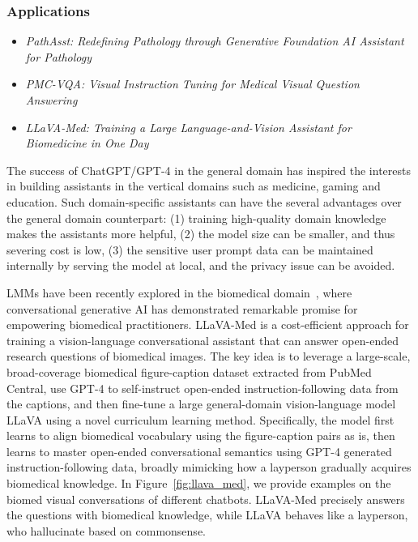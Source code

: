 \documentclass{article}
\begin{document}
\subsubsection{Applications}

\begin{itemize}[leftmargin=7.5mm]
\setlength{\itemsep}{2pt}
\footnotesize
\item 
{\it PathAsst: Redefining Pathology through Generative Foundation AI Assistant for Pathology~\citep{sun2023pathasst}}

\item
{\it PMC-VQA: Visual Instruction Tuning for Medical Visual Question Answering~\citep{zhang2023pmc}}

\item
{\it LLaVA-Med: Training a Large Language-and-Vision Assistant for Biomedicine in One Day~\citep{li2023llava}}
\end{itemize}

The success of ChatGPT/GPT-4 in the general domain has inspired the interests in building assistants in the vertical domains such as medicine, gaming and education. Such domain-specific assistants can have the several advantages over the general domain counterpart: (1) training high-quality domain knowledge makes the assistants more helpful, (2) the model size can be smaller, and thus severing cost is low, (3) the sensitive user prompt data can be maintained internally by serving the model at local, and the privacy issue can be avoided.



LMMs have been recently explored in the biomedical domain~\citep{sun2023pathasst,zhang2023pmc,li2023llava}, where conversational generative AI has demonstrated remarkable promise for empowering biomedical practitioners.
%
LLaVA-Med is a cost-efficient approach for training a vision-language conversational assistant that can answer open-ended research questions of biomedical images. The key idea is to leverage a large-scale, broad-coverage biomedical figure-caption dataset extracted from PubMed Central, use GPT-4 to self-instruct open-ended instruction-following data from the captions, and then fine-tune a large general-domain vision-language model LLaVA using a novel curriculum learning method. Specifically, the model first learns to align biomedical vocabulary using the figure-caption pairs as is, then learns to master open-ended conversational semantics using GPT-4 generated instruction-following data, broadly mimicking how a layperson gradually acquires biomedical knowledge. In Figure~\ref{fig:llava_med}, we provide examples on the biomed visual conversations of different chatbots. LLaVA-Med precisely answers the questions with biomedical knowledge, while LLaVA behaves like a layperson, who hallucinate based on commonsense.
\end{document}
